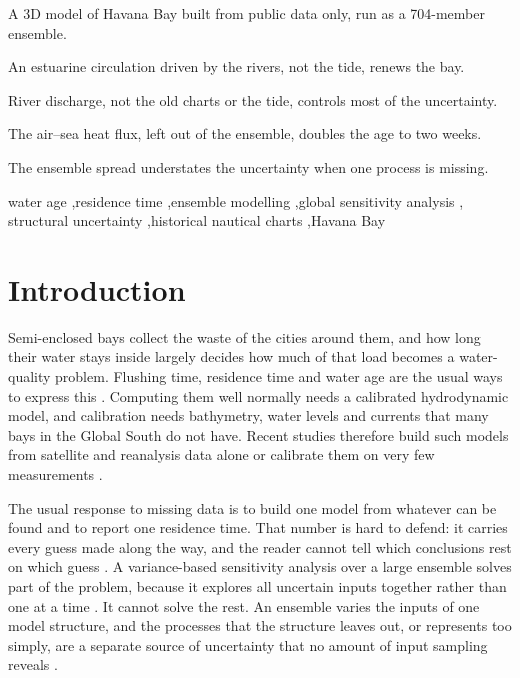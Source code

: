 \documentclass[a4paper,fleqn]{ems-dc}
\begin{document}
\begin{highlights}
\item A 3D model of Havana Bay built from public data only, run as a 704-member ensemble.
\item An estuarine circulation driven by the rivers, not the tide, renews the bay.
\item River discharge, not the old charts or the tide, controls most of the uncertainty.
\item The air--sea heat flux, left out of the ensemble, doubles the age to two weeks.
\item The ensemble spread understates the uncertainty when one process is missing.
\end{highlights}

\begin{keywords}
water age \sep residence time \sep ensemble modelling \sep global sensitivity analysis \sep
structural uncertainty \sep historical nautical charts \sep Havana Bay
\end{keywords}

\maketitle

\section{Introduction}\label{sec:intro}
Semi-enclosed bays collect the waste of the cities around them, and how long their water
stays inside largely decides how much of that load becomes a water-quality problem.
Flushing time, residence time and water age are the usual ways to express this
\citep{Monsen2002,Deleersnijder2001,Lucas2020}. Computing them well normally needs a
calibrated hydrodynamic model, and calibration needs bathymetry, water levels and currents
that many bays in the Global South do not have. Recent studies therefore build such models
from satellite and reanalysis data alone \citep{Payandeh2026} or calibrate them on very few
measurements \citep{RodriguesDoAmaral2025}.

The usual response to missing data is to build one model from whatever can be found and to
report one residence time. That number is hard to defend: it carries every guess made along
the way, and the reader cannot tell which conclusions rest on which guess
\citep{Uusitalo2015}. A variance-based sensitivity analysis over a large ensemble
\citep{Sobol2001,Saltelli2008,Saltelli2010} solves part of the problem, because it explores
all uncertain inputs together rather than one at a time
\citep{Saltelli2019,Pianosi2016,Razavi2021}. It cannot solve the rest. An ensemble varies the
inputs of one model structure, and the processes that the structure leaves out, or
represents too simply, are a separate source of uncertainty that no amount of input
sampling reveals \citep{Walker2003,Refsgaard2006,Gupta2012}.
\end{document}
